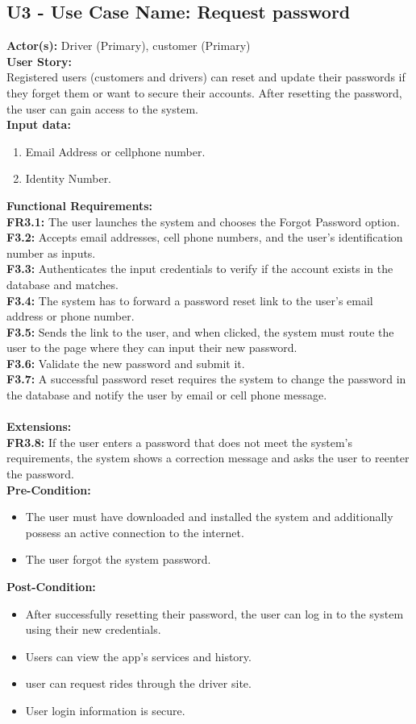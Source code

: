 \documentclass[9pt]{report}
\begin{document}
\subsection*{U3 - Use Case Name: Request password}
\textbf{Actor(s):} Driver (Primary), customer (Primary)
\textbf{\\User Story:} \\ Registered users (customers and drivers) can reset and update their passwords if they forget them or want to secure their accounts. After resetting the password, the user can gain access to the system.
\textbf{\\Input data:}
\begin{enumerate}
    \item Email Address or cellphone number.
    \item Identity Number.
\end{enumerate}
\textbf{Functional Requirements:}
\\\textbf{FR3.1:} The user launches the system and chooses the Forgot Password option.
\\\textbf{F3.2:} Accepts email addresses, cell phone numbers, and the user's identification number as inputs.
\\\textbf{F3.3:} Authenticates the input credentials to verify if the account exists in the database and matches.
\\\textbf{F3.4:} The system has to forward a password reset link to the user's email address or phone number.
\\\textbf{F3.5:} Sends the link to the user, and when clicked, the system must route the user to the page where they can input their new password.
\\\textbf{F3.6:} Validate the new password and submit it.
\\\textbf{F3.7:} A successful password reset requires the system to change the password in the database and notify the user by email or cell phone message.\\\\
\textbf{Extensions:}
\\ \textbf{FR3.8:} If the user enters a password that does not meet the system's requirements, the system shows a correction message and asks the user to reenter the password.\\
\textbf{Pre-Condition:} 
\begin{itemize}
    \item The user must have downloaded and installed the system and additionally possess an active connection to the internet.
    \item The user forgot the system password.
\end{itemize}
\textbf{Post-Condition:} 
\begin{itemize}
    \item After successfully resetting their password, the user can log in to the system using their new credentials.
    \item Users can view the app's services and history.
    \item user can request rides through the driver site.
    \item User login information is secure.
\end{itemize}
\end{document}
